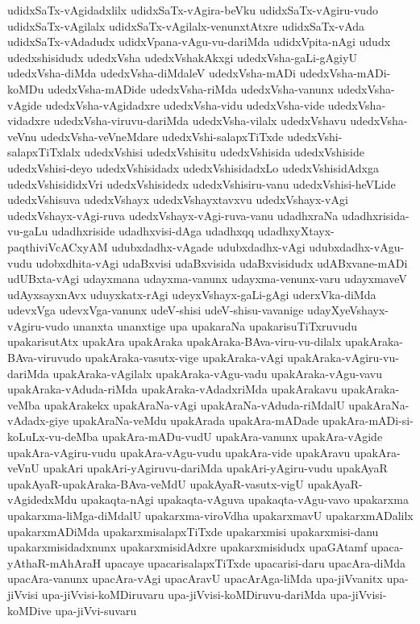 {udidxSaTx-vAgidadxlilx
udidxSaTx-vAgira-beVku
udidxSaTx-vAgiru-vudo
udidxSaTx-vAgilalx
udidxSaTx-vAgilalx-venunxtAtxre
udidxSaTx-vAda
udidxSaTx-vAdadudx
udidxVpana-vAgu-vu-dariMda
udidxVpita-nAgi
ududx
udedxshisidudx
udedxVsha
udedxVshakAkxgi
udedxVsha-gaLi-gAgiyU
udedxVsha-diMda
udedxVsha-diMdaleV
udedxVsha-mADi
udedxVsha-mADi-koMDu
udedxVsha-mADide
udedxVsha-riMda
udedxVsha-vanunx
udedxVsha-vAgide
udedxVsha-vAgidadxre
udedxVsha-vidu
udedxVsha-vide
udedxVsha-vidadxre
udedxVsha-viruvu-dariMda
udedxVsha-vilalx
udedxVshavu
udedxVsha-veVnu
udedxVsha-veVneMdare
udedxVshi-salapxTiTxde
udedxVshi-salapxTiTxlalx
udedxVshisi
udedxVshisitu
udedxVshisida
udedxVshiside
udedxVshisi-deyo
udedxVshisidadx
udedxVshisidadxLo
udedxVshisidAdxga
udedxVshisididxVri
udedxVshisidedx
udedxVshisiru-vanu
udedxVshisi-heVLide
udedxVshisuva
udedxVshayx
udedxVshayxtavxvu
udedxVshayx-vAgi
udedxVshayx-vAgi-ruva
udedxVshayx-vAgi-ruva-vanu
udadhxraNa
udadhxrisida-vu-gaLu
udadhxriside
udadhxvisi-dAga
udadhxqq
udadhxyXtayx-paqthiviVcACxyAM
udubxdadhx-vAgade
udubxdadhx-vAgi
udubxdadhx-vAgu-vudu
udobxdhita-vAgi
udaBxvisi
udaBxvisida
udaBxvisidudx
udABxvane-mADi
udUBxta-vAgi
udayxmana
udayxma-vanunx
udayxma-venunx-varu
udayxmaveV
udAyxsayxnAvx
uduyxkatx-rAgi
udeyxVshayx-gaLi-gAgi
uderxVka-diMda
udevxVga
udevxVga-vanunx
udeV-shisi
udeV-shisu-vavanige
udayXyeVshayx-vAgiru-vudo
unanxta
unanxtige
upa
upakaraNa
upakarisuTiTxruvudu
upakarisutAtx
upakAra
upakAraka
upakAraka-BAva-viru-vu-dilalx
upakAraka-BAva-viruvudo
upakAraka-vasutx-vige
upakAraka-vAgi
upakAraka-vAgiru-vu-dariMda
upakAraka-vAgilalx
upakAraka-vAgu-vadu
upakAraka-vAgu-vavu
upakAraka-vAduda-riMda
upakAraka-vAdadxriMda
upakArakavu
upakAraka-veMba
upakArakekx
upakAraNa-vAgi
upakAraNa-vAduda-riMdalU
upakAraNa-vAdadx-giye
upakAraNa-veMdu
upakArada
upakAra-mADade
upakAra-mADi-si-koLuLx-vu-deMba
upakAra-mADu-vudU
upakAra-vanunx
upakAra-vAgide
upakAra-vAgiru-vudu
upakAra-vAgu-vudu
upakAra-vide
upakAravu
upakAra-veVnU
upakAri
upakAri-yAgiruvu-dariMda
upakAri-yAgiru-vudu
upakAyaR
upakAyaR-upakAraka-BAva-veMdU
upakAyaR-vasutx-vigU
upakAyaR-vAgidedxMdu
upakaqta-nAgi
upakaqta-vAguva
upakaqta-vAgu-vavo
upakarxma
upakarxma-liMga-diMdalU
upakarxma-viroVdha
upakarxmavU
upakarxmADalilx
upakarxmADiMda
upakarxmisalapxTiTxde
upakarxmisi
upakarxmisi-danu
upakarxmisidadxnunx
upakarxmisidAdxre
upakarxmisidudx
upaGAtamf
upaca-yAthaR-mAhAraH
upacaye
upacarisalapxTiTxde
upacarisi-daru
upacAra-diMda
upacAra-vanunx
upacAra-vAgi
upacAravU
upacArAga-liMda
upa-jiVvanitx
upa-jiVvisi
upa-jiVvisi-koMDiruvaru
upa-jiVvisi-koMDiruvu-dariMda
upa-jiVvisi-koMDive
upa-jiVvi-suvaru
}
